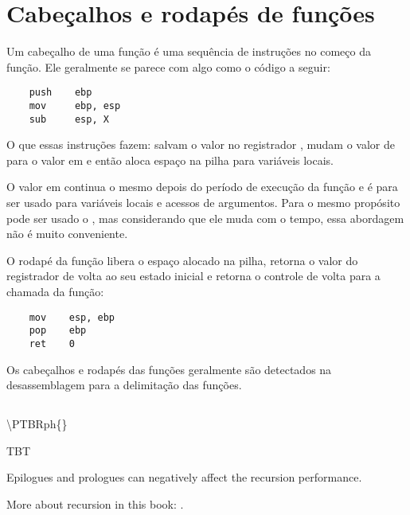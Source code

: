 \section{Cabeçalhos e rodapés de funções}
\label{sec:prologepilog}
\myindex{\PTBRph{}} %
\myindex{\PTBRph{}} %

Um cabeçalho de uma função é uma sequência de instruções no começo da função. Ele geralmente se parece com algo como o código a seguir:

\begin{lstlisting}
    push    ebp
    mov     ebp, esp
    sub     esp, X
\end{lstlisting}

O que essas instruções fazem: salvam o valor no registrador \EBP, mudam o valor de \EBP para o valor em \ESP e então aloca espaço na pilha para variáveis locais.

O valor em \EBP continua o mesmo depois do período de execução da função e é para ser usado para variáveis locais e acessos de argumentos.
Para o mesmo propósito pode ser usado o \ESP, mas considerando que ele muda com o tempo, essa abordagem não é muito conveniente.

O rodapé da função libera o espaço alocado na pilha, retorna o valor do registrador \EBP de volta ao seu estado inicial e retorna o controle de volta para a chamada da função:

\begin{lstlisting}
    mov    esp, ebp
    pop    ebp
    ret    0
\end{lstlisting}

Os cabeçalhos e rodapés das funções geralmente são detectados na desassemblagem para a delimitação das funções.

\subsection{\Recursion}

\ac{\PTBRph{}}

\myindex{\Recursion}
\ac{TBT}

Epilogues and prologues can negatively affect the recursion performance.

More about recursion in this book: .

